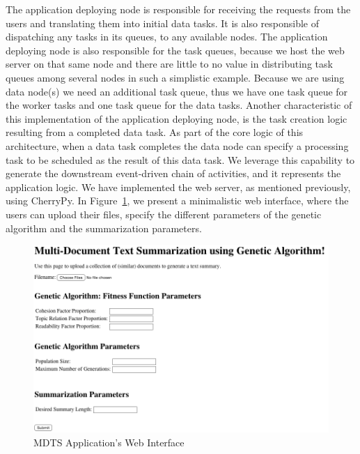 \documentclass[12pt, titlepage]{uo_temp}
\begin{document}
     The application deploying node is responsible for receiving the requests from the
     users and translating them into initial data tasks. It is also responsible of
     dispatching any tasks in its queues, to any available nodes. 
     The application deploying node is also responsible for the task queues, because we host
     the web server on that same node and there are little to no value in distributing
     task queues among several nodes in such a simplistic example. Because we are
     using data node(s) we need an additional task queue, thus we have one task queue for the
     worker tasks and one task queue for the data tasks.
     Another characteristic of this implementation of the application deploying node, is
     the task creation logic resulting from a completed data task. As part of the core
     logic of this architecture, when a data task completes the data node can specify a
     processing task to be scheduled as the result of this data task. We leverage this
     capability to generate the downstream event-driven chain of activities, and it
     represents the application logic.
     We have implemented the web server, as mentioned previously, using CherryPy. In
     Figure~\ref{mdts_home}, we present a minimalistic web interface, where the users can
     upload their files, specify the different parameters of the genetic algorithm and the
     summarization parameters.

     \begin{figure}[h!]
       \centering
       \includegraphics[width=125mm]{images/mdts_home.png}
       \caption{MDTS Application's Web Interface}
       \label{mdts_home}
     \end{figure}
     
\end{document}
